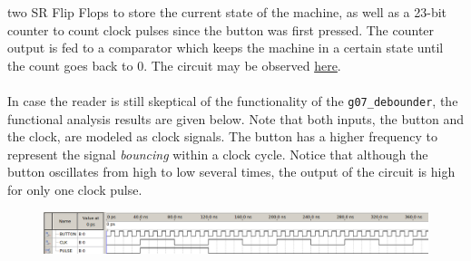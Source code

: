 \documentclass[12pt]{report}
\begin{document}
two SR Flip Flops to store the current state of the machine, as well as a 23-bit counter to count
clock pulses since the button was first pressed. The counter output is fed to a comparator which
keeps the machine in a certain state until the count goes back to 0. The circuit may be observed
\hyperref[app:debounder]{here}.\\\\
In case the reader is still skeptical of the functionality of the \texttt{g07\_debounder}, the
functional analysis results are given below. Note that both inputs, the button and the clock, are
modeled as clock signals. The button has a higher frequency to represent the signal
\textit{bouncing} within a clock cycle. Notice that although the button oscillates from high to low
several times, the output of the circuit is high for only one clock pulse.
\begin{figure}[h]
	\begin{center}
		\includegraphics[scale=0.5]{debounderresults}
	\end{center}
\end{figure}
\end{document}
